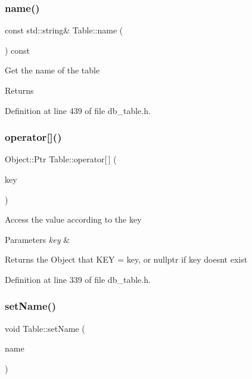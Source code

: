 \subsubsection{\texorpdfstring{name()}{name()}}
{\footnotesize\ttfamily const std\+::string\& Table\+::name (\begin{DoxyParamCaption}{ }\end{DoxyParamCaption}) const\hspace{0.3cm}{\ttfamily [inline]}}

Get the name of the table \begin{DoxyReturn}{Returns}

\end{DoxyReturn}


Definition at line 439 of file db\+\_\+table.\+h.

\mbox{\label{class_table_a71ca4f3dfa88d0b057cd63920c5028e9}} 
\subsubsection{\texorpdfstring{operator[]()}{operator[]()}}
{\footnotesize\ttfamily Object\+::\+Ptr Table\+::operator\mbox{[}$\,$\mbox{]} (\begin{DoxyParamCaption}\item[{const Key\+Type \&}]{key }\end{DoxyParamCaption})\hspace{0.3cm}{\ttfamily [inline]}}

Access the value according to the key 
\begin{DoxyParams}{Parameters}
{\em key} & \\
\hline
\end{DoxyParams}
\begin{DoxyReturn}{Returns}
the Object that K\+EY = key, or nullptr if key doesn\textquotesingle{}t exist 
\end{DoxyReturn}


Definition at line 339 of file db\+\_\+table.\+h.

\mbox{\label{class_table_aaee2603a21e2ad0de4e073ada88e4b8d}} 
\subsubsection{\texorpdfstring{set\+Name()}{setName()}}
{\footnotesize\ttfamily void Table\+::set\+Name (\begin{DoxyParamCaption}\item[{std\+::string}]{name }\end{DoxyParamCaption})\hspace{0.3cm}{\ttfamily [inline]}}

